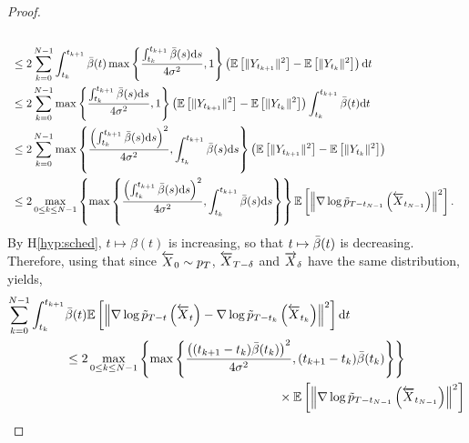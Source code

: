 \documentclass[english,graybox,envcountchap,envcountsame,sectrefs,shortlabels]{svmono}
\theoremstyle{style}
\newcommand{\eqsp}{}
\begin{document}
\begin{proof}
\begin{align*}
    \\
    &\hspace{.1cm} \leq
    2 \sum_{k = 0}^{N-1} \int_{t_k}^{t_{k+1}} \bar \sched (t)  \max \left\{ \frac{\int_{t_k}^{t_{k +1}} \bar \sched (s) \rmd s}{ 4 \sigma^2} , 1 \right\} \left( \mathbb{E} \left[ \|Y_{t_{k+1}}\|^2 \right] - \mathbb{E} \left[ \|Y_{t_k}\|^2 \right] \right) \rmd t
    \\
    &\hspace{.1cm} \leq
    2 \sum_{k = 0}^{N-1}  \max \left\{ \frac{\int_{t_k}^{t_{k +1}} \bar \sched (s) \rmd s}{4 \sigma^2} , 1 \right\} \left( \mathbb{E} \left[ \|Y_{t_{k+1}}\|^2 \right] - \mathbb{E} \left[ \|Y_{t_k}\|^2 \right] \right) \int_{t_k}^{t_{k+1}} \bar \sched (t) \rmd t
    \\
    &\hspace{.1cm} \leq
    2 \sum_{k = 0}^{N-1}  \max \left\{ \frac{ \left( \int_{t_k}^{t_{k +1}} \bar \sched (s) \rmd s \right)^2 }{ 4 \sigma^2} , \int_{t_k}^{t_{k +1}} \bar \sched (s) \rmd s \right\} \left( \mathbb{E} \left[ \|Y_{t_{k+1}}\|^2 \right] - \mathbb{E} \left[ \|Y_{t_k}\|^2 \right] \right)
    \\
    &\hspace{.1cm} \leq
    2 \max_{0 \leq k \leq N-1} \left\{ \max \left\{ \frac{ \left( \int_{t_k}^{t_{k +1}} \bar \sched (s) \rmd s \right)^2 }{ 4 \sigma^2} , \int_{t_k}^{t_{k +1}} \bar \sched (s) \rmd s \right\} \right\}  \mathbb{E} \left[ \left\|\nabla \log \tilde p_{T-t_{N-1}} \left(\ola X_{t_{N-1}} \right) \right\|^2 \right]\eqsp.
\end{align*}
By H\ref{hyp:sched}, $t \mapsto \beta(t)$ is increasing, so that $t \mapsto \bar {\beta}(t)$ is decreasing. 
Therefore, using that since $\overleftarrow X_0 \sim p_T$, $\overleftarrow X_{T - \delta}$ and $\overrightarrow X_{\delta}$ have the same distribution, yields,
\begin{align*}
     \sum_{k = 0}^{N-1} \int_{t_k}^{t_{k+1}} &\bar \sched (t) \mathbb{E} \left[  \left\|   \nabla \log \tilde p_{T-t}\left(\ola X_t\right) - \nabla \log \tilde p_{T-t_k}\left(\ola X_{t_k}\right) \right\|^2 \right] \rmd t
    \\
    & \leq
    2 \max_{0 \leq k \leq N-1} \left\{ \max \left\{ \frac{ \left( (t_{k +1} - t_k) \bar \sched (t_k) \right)^2 }{ 4 \sigma^2} , (t_{k+1}  - t_k) \bar \sched (t_k)  \right\} \right\}\\
    &\hspace{6cm}\times\mathbb{E} \left[ \left\|\nabla \log \tilde p_{T-t_{N-1}} \left(\ola X_{t_{N-1}} \right) \right\|^2 \right] 
    \\

\end{align*}
\end{proof}
\end{document}
